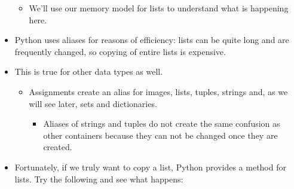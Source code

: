 \documentclass[letterpaper,10pt,english]{sphinxmanual}
\begin{document}
\begin{itemize}
\begin{itemize}
\item {} 
We’ll use our memory model for lists to understand what is
happening here.

\end{itemize}

\item {} 
Python uses aliases for reasons of efficiency: lists can be quite
long and are frequently changed, so copying of entire lists is
expensive.

\item {} 
This is true for other  data types as well.
\begin{itemize}
\item {} 
Assignments create an alias for images, lists, tuples, strings and, as we
will see later, sets and dictionaries.
\begin{itemize}
\item {} 
Aliases of strings and tuples do not create the same confusion
as other containers because they can not be changed once they
are created.

\end{itemize}

\end{itemize}

\item {} 
Fortunately, if we truly want to copy a list, Python provides a
 method for lists.  Try the following and see what
happens:

\begin{sphinxVerbatim}[commandchars=\\\{\}]
  \PYG{p}{[}  \PYG{p}{]}
  
\end{sphinxVerbatim}

\end{itemize}
\end{document}
